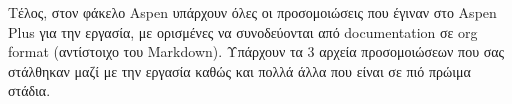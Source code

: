 \documentclass[11pt]{article}
\begin{document}
Τέλος, στον φάκελο Aspen υπάρχουν όλες οι προσομοιώσεις που έγιναν στο Aspen Plus για την εργασία, με ορισμένες να συνοδεύονται από documentation σε org format (αντίστοιχο του Markdown). Υπάρχουν τα 3 αρχεία προσομοιώσεων που σας στάλθηκαν μαζί με την εργασία καθώς και πολλά άλλα που είναι σε πιό πρώιμα στάδια.
\end{document}
